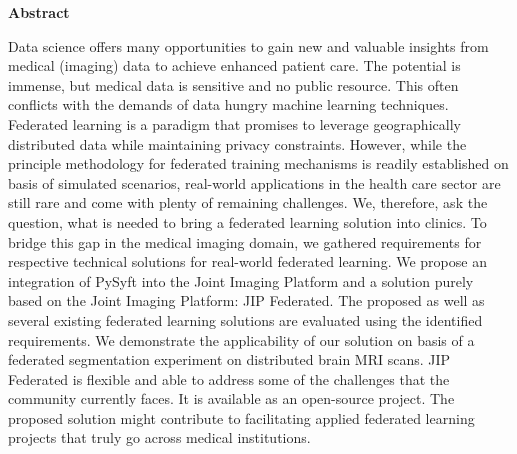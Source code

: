 {\Large \textbf{Abstract}} 

\bigskip

Data science offers many opportunities to gain new and valuable insights from medical (imaging) data to achieve enhanced patient care. The potential is immense, but medical data is sensitive and no public resource. This often conflicts with the demands of data hungry machine learning techniques. Federated learning is a paradigm that promises to leverage geographically distributed data while maintaining privacy constraints. However, while the principle methodology for federated training mechanisms is readily established on basis of simulated scenarios, real-world applications in the health care sector are still rare and come with plenty of remaining challenges.
We, therefore, ask the question, what is needed to bring a federated learning solution into clinics.
To bridge this gap in the medical imaging domain, we gathered requirements for respective technical solutions for real-world federated learning. We propose an integration of PySyft into the Joint Imaging Platform and a solution purely based on the Joint Imaging Platform: JIP Federated. The proposed as well as several existing federated learning solutions are evaluated using the identified requirements.
We demonstrate the applicability of our solution on basis of a federated segmentation experiment on distributed brain MRI scans. JIP Federated is flexible and able to address some of the challenges that the community currently faces. It is available as an open-source project.
The proposed solution might contribute to facilitating applied federated learning projects that truly go across medical institutions.







